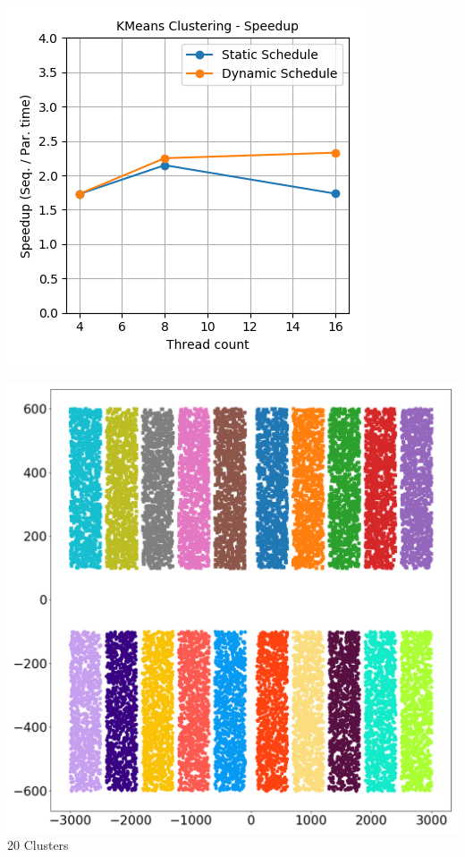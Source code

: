 \documentclass[11pt,a4paper,oneside]{article}
\begin{document}
	\begin{center}
		\includegraphics[scale=0.6]{1.png}		
	\end{center}

    \begin{center}
    	\includegraphics[scale=0.2]{2.png}	\\
    	20 Clusters	
    \end{center}
	 
\end{document}
